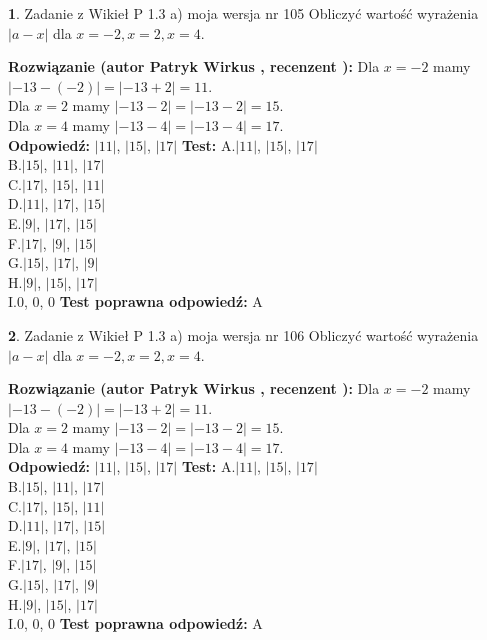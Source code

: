 \documentclass[12pt, a4paper]{article}
\theoremstyle{definition} %
\newtheorem{zad}{}
\newcommand{\zadStart}[1]{\begin{zad}#1\newline}
\newcommand{\zadStop}{\end{zad}}
\newcommand{\rozwStart}[2]{\noindent \textbf{Rozwiązanie (autor #1 , recenzent #2): }\newline}
\newcommand{\rozwStop}{\newline}
\newcommand{\odpStart}{\noindent \textbf{Odpowiedź:}\newline}
\newcommand{\odpStop}{\newline}
\newcommand{\testStart}{\noindent \textbf{Test:}\newline}
\newcommand{\testStop}{\newline}
\newcommand{\kluczStart}{\noindent \textbf{Test poprawna odpowiedź:}\newline}
\newcommand{\kluczStop}{\newline}
\begin{document}
\zadStart{Zadanie z Wikieł P 1.3 a) moja wersja nr 105}
Obliczyć wartość wyrażenia $|a - x|$ dla $x=-2,x=2,x=4$.
\zadStop
\rozwStart{Patryk Wirkus}{}
Dla $x = -2$ mamy $|-13 - (-2)| = |-13 + 2| = 11$.\\
Dla $x = 2$ mamy $|-13 - 2| = |-13 - 2| = 15$.\\
Dla $x = 4$ mamy $|-13 - 4| = |-13 - 4| = 17$.\\
\rozwStop
\odpStart
$|11|$, $|15|$, $|17|$
\odpStop
\testStart
A.$|11|$, $|15|$, $|17|$\\
B.$|15|$, $|11|$, $|17|$\\
C.$|17|$, $|15|$, $|11|$\\
D.$|11|$, $|17|$, $|15|$\\
E.$|9|$, $|17|$, $|15|$\\
F.$|17|$, $|9|$, $|15|$\\
G.$|15|$, $|17|$, $|9|$\\
H.$|9|$, $|15|$, $|17|$\\
I.$0$, $0$, $0$
\testStop
\kluczStart
A
\kluczStop



\zadStart{Zadanie z Wikieł P 1.3 a) moja wersja nr 106}
Obliczyć wartość wyrażenia $|a - x|$ dla $x=-2,x=2,x=4$.
\zadStop
\rozwStart{Patryk Wirkus}{}
Dla $x = -2$ mamy $|-13 - (-2)| = |-13 + 2| = 11$.\\
Dla $x = 2$ mamy $|-13 - 2| = |-13 - 2| = 15$.\\
Dla $x = 4$ mamy $|-13 - 4| = |-13 - 4| = 17$.\\
\rozwStop
\odpStart
$|11|$, $|15|$, $|17|$
\odpStop
\testStart
A.$|11|$, $|15|$, $|17|$\\
B.$|15|$, $|11|$, $|17|$\\
C.$|17|$, $|15|$, $|11|$\\
D.$|11|$, $|17|$, $|15|$\\
E.$|9|$, $|17|$, $|15|$\\
F.$|17|$, $|9|$, $|15|$\\
G.$|15|$, $|17|$, $|9|$\\
H.$|9|$, $|15|$, $|17|$\\
I.$0$, $0$, $0$
\testStop
\kluczStart
A
\kluczStop
\end{document}
